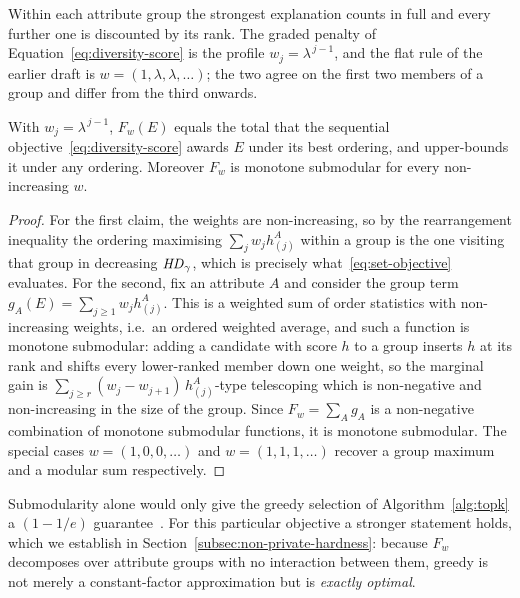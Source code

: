 Within each attribute group the strongest explanation counts in full and every further one is discounted by its rank.
The graded penalty of Equation~\eqref{eq:diversity-score} is the profile $w_j=\lambda^{\,j-1}$, and the flat rule of the earlier draft is $w=(1,\lambda,\lambda,\dots)$; the two agree on the first two members of a group and differ from the third onwards.

\begin{proposition}
\label{prop:setobj}
With $w_j=\lambda^{\,j-1}$, $F_w(E)$ equals the total that the sequential objective~\eqref{eq:diversity-score} awards $E$ under its best ordering, and upper-bounds it under any ordering.
Moreover $F_w$ is monotone submodular for every non-increasing $w$.
\end{proposition}

\begin{proof}
For the first claim, the weights are non-increasing, so by the rearrangement inequality the ordering maximising $\sum_j w_j h^A_{(j)}$ within a group is the one visiting that group in decreasing $\mathit{HD}_\gamma$, which is precisely what~\eqref{eq:set-objective} evaluates.
For the second, fix an attribute $A$ and consider the group term
$g_A(E)=\sum_{j\ge1} w_j h^A_{(j)}$.
This is a weighted sum of order statistics with non-increasing weights, i.e.\ an ordered weighted average, and such a function is monotone submodular: adding a candidate with score $h$ to a group inserts $h$ at its rank and shifts every lower-ranked member down one weight, so the marginal gain is
$\sum_{j\ge r} (w_j-w_{j+1})\,h^A_{(j)}$-type telescoping which is non-negative and non-increasing in the size of the group.
Since $F_w=\sum_A g_A$ is a non-negative combination of monotone submodular functions, it is monotone submodular.
The special cases $w=(1,0,0,\dots)$ and $w=(1,1,1,\dots)$ recover a group maximum and a modular sum respectively.
\end{proof}

Submodularity alone would only give the greedy selection of Algorithm~\ref{alg:topk} a $(1-1/e)$ guarantee~\cite{NemhauserWF78}.
For this particular objective a stronger statement holds, which we establish in Section~\ref{subsec:non-private-hardness}: because $F_w$ decomposes over attribute groups with no interaction between them, greedy is not merely a constant-factor approximation but is \emph{exactly optimal}.

